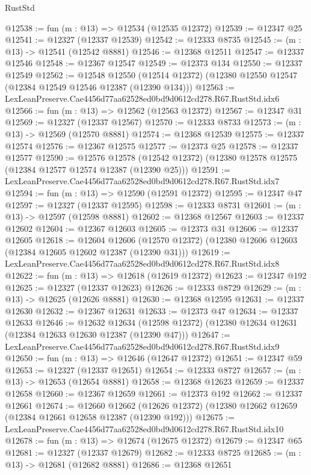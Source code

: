 \begin{lexlean}{RustStd}
\begin{coremodule}
@12538 := fun (m : @13) => @12534 (@12535 @12372)
@12539 := @12347 @25
@12541 := @12327 (@12337 @12539)
@12542 := @12333 @8735
@12545 := (m : @13) -> @12541 (@12542 @8881)
@12546 := @12368 @12511
@12547 := @12337 @12546
@12548 := @12367 @12547
@12549 := @12373 @134
@12550 := @12337 @12549
@12562 := @12548
    @12550
    (@12514 @12372)
    (@12380 @12550 @12547 (@12384 @12549 @12546 @12387 (@12390 @134)))
@12563 := LexLeanPreserve.Cae4456d77aa62528ed0bd9d0612cd278.R67.RustStd.idx6
@12566 := fun (m : @13) => @12562 (@12563 @12372)
@12567 := @12347 @31
@12569 := @12327 (@12337 @12567)
@12570 := @12333 @8733
@12573 := (m : @13) -> @12569 (@12570 @8881)
@12574 := @12368 @12539
@12575 := @12337 @12574
@12576 := @12367 @12575
@12577 := @12373 @25
@12578 := @12337 @12577
@12590 := @12576
    @12578
    (@12542 @12372)
    (@12380 @12578 @12575 (@12384 @12577 @12574 @12387 (@12390 @25)))
@12591 := LexLeanPreserve.Cae4456d77aa62528ed0bd9d0612cd278.R67.RustStd.idx7
@12594 := fun (m : @13) => @12590 (@12591 @12372)
@12595 := @12347 @47
@12597 := @12327 (@12337 @12595)
@12598 := @12333 @8731
@12601 := (m : @13) -> @12597 (@12598 @8881)
@12602 := @12368 @12567
@12603 := @12337 @12602
@12604 := @12367 @12603
@12605 := @12373 @31
@12606 := @12337 @12605
@12618 := @12604
    @12606
    (@12570 @12372)
    (@12380 @12606 @12603 (@12384 @12605 @12602 @12387 (@12390 @31)))
@12619 := LexLeanPreserve.Cae4456d77aa62528ed0bd9d0612cd278.R67.RustStd.idx8
@12622 := fun (m : @13) => @12618 (@12619 @12372)
@12623 := @12347 @192
@12625 := @12327 (@12337 @12623)
@12626 := @12333 @8729
@12629 := (m : @13) -> @12625 (@12626 @8881)
@12630 := @12368 @12595
@12631 := @12337 @12630
@12632 := @12367 @12631
@12633 := @12373 @47
@12634 := @12337 @12633
@12646 := @12632
    @12634
    (@12598 @12372)
    (@12380 @12634 @12631 (@12384 @12633 @12630 @12387 (@12390 @47)))
@12647 := LexLeanPreserve.Cae4456d77aa62528ed0bd9d0612cd278.R67.RustStd.idx9
@12650 := fun (m : @13) => @12646 (@12647 @12372)
@12651 := @12347 @59
@12653 := @12327 (@12337 @12651)
@12654 := @12333 @8727
@12657 := (m : @13) -> @12653 (@12654 @8881)
@12658 := @12368 @12623
@12659 := @12337 @12658
@12660 := @12367 @12659
@12661 := @12373 @192
@12662 := @12337 @12661
@12674 := @12660
    @12662
    (@12626 @12372)
    (@12380 @12662 @12659 (@12384 @12661 @12658 @12387 (@12390 @192)))
@12675 := LexLeanPreserve.Cae4456d77aa62528ed0bd9d0612cd278.R67.RustStd.idx10
@12678 := fun (m : @13) => @12674 (@12675 @12372)
@12679 := @12347 @65
@12681 := @12327 (@12337 @12679)
@12682 := @12333 @8725
@12685 := (m : @13) -> @12681 (@12682 @8881)
@12686 := @12368 @12651

\end{coremodule}
\end{lexlean}
